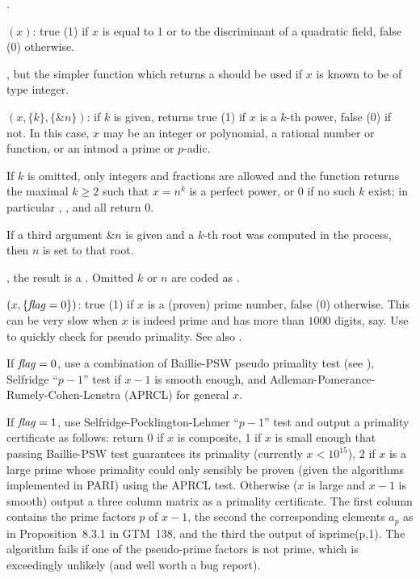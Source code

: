 .

$(x)$: true (1) if $x$ is equal to 1 or to the
discriminant of a quadratic field, false (0) otherwise.

, but the simpler function 
which returns a  should be used if $x$ is known to be of type
integer.

$(x,\{k\}, \{\&n\})$:
if $k$ is given, returns true (1) if $x$ is a $k$-th power, false
(0) if not. In this case, $x$ may be an integer or polynomial,
a rational number or function, or an intmod a prime or $p$-adic.

If $k$ is omitted, only integers and fractions are allowed and the
function returns the maximal $k \geq 2$ such that $x = n^k$ is a perfect
power, or 0 if no such $k$ exist; in particular ,
, and  all return $0$.

If a third argument $\&n$ is given and a $k$-th root was computed in the
process, then $n$ is set to that root.

, the result is a . Omitted $k$ or $n$
are coded as .

$(x,\{\hbox{\it f\kern0pt lag\/}=0\})$: true (1) if $x$ is a (proven) prime
number, false (0) otherwise. This can be very slow when $x$ is indeed
prime and has more than $1000$ digits, say. Use  to
quickly check for pseudo primality. See also .

If $\hbox{\it f\kern0pt lag\/}=0$, use a combination of Baillie-PSW pseudo primality test (see
), Selfridge ``$p-1$'' test if $x-1$ is smooth enough, and
Adleman-Pomerance-Rumely-Cohen-Lenstra (APRCL) for general $x$.

If $\hbox{\it f\kern0pt lag\/}=1$, use Selfridge-Pocklington-Lehmer ``$p-1$'' test and output a
primality certificate as follows: return 0 if $x$ is composite, 1 if $x$ is
small enough that passing Baillie-PSW test guarantees its primality
(currently $x < 10^{15}$), $2$ if $x$ is a large prime whose primality could
only sensibly be proven (given the algorithms implemented in PARI) using the
APRCL test. Otherwise ($x$ is large and $x-1$ is smooth) output a three
column matrix as a primality certificate. The first column contains the prime
factors $p$ of $x-1$, the second the corresponding elements $a_p$ as in
Proposition~8.3.1 in GTM~138, and the third the output of isprime(p,1). The
algorithm fails if one of the pseudo-prime factors is not prime, which is
exceedingly unlikely (and well worth a bug report).

